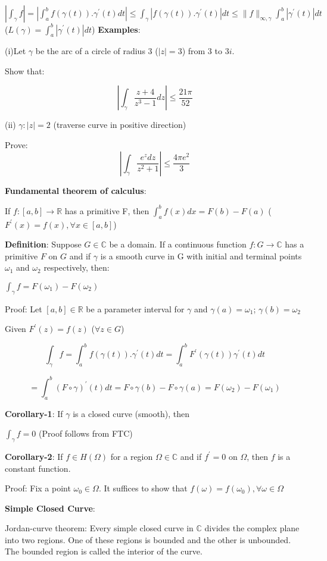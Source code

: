 \documentclass{article}
\begin{document}
\begin{flushleft}
$|\int_{\gamma}^{} f|= |\int_{a}^{b} f(\gamma(t)).\gamma^{'}(t) dt| \leq \int_{\gamma}^{} |f(\gamma(t)).\gamma^{'}(t)| dt
\leq \|f\|_{\infty,\gamma} \int_{a}^{b} |\gamma^{'}(t)| dt$   ($L(\gamma)=\int_{a}^{b} |\gamma^{'}(t)| dt$)
\textbf{Examples}: 

(i)Let $\gamma$ be the arc of a circle of radius 3 ($|z|=3$) from $3$ to $3i$.

Show that:

$$|\int_{\gamma}^{} \frac{z+4}{z^3-1} dz| \leq \frac{21\pi}{52}$$

(ii) $\gamma: |z|=2$  (traverse curve in positive direction)

Prove: $$|\int_{\gamma}^{} \frac{e^z dz}{z^2+1} | \leq \frac{4\pi e^2}{3}$$

\textbf{Fundamental theorem of calculus}: 

If $f:[a,b]\rightarrow \mathds{R}$ has a primitive F, then $\int_{a}^{b} f(x) dx =F(b)-F(a)$ ($F^{'}(x)=f(x), \forall x\in [a,b]$)

\textbf{Definition}: Suppose $G\in \mathds{C}$ be a domain. If a continuous function $f:G\rightarrow \mathds{C}$ has a primitive $F$ on $G$ and if $\gamma$ is a smooth curve in G with initial and terminal points $\omega_1$ and $\omega_2$ respectively, then:

$\int_{\gamma}^{} f = F(\omega_1) - F(\omega_2)$

Proof: Let $[a,b]\in \mathds{R}$ be a parameter interval for $\gamma$ and $\gamma(a)=\omega_1$; $\gamma(b)=\omega_2$

Given $F^{'}(z)=f(z)$   ($\forall z \in G$)

$$\int_{\gamma}^{} f = \int_{a}^{b} f(\gamma(t)).\gamma^{'}(t) dt = \int_{a}^{b} F^{'}(\gamma(t))\gamma^{'}(t) dt$$

$$= \int_{a}^{b} (F \circ \gamma)^{'}(t) dt = F \circ \gamma(b)-F \circ \gamma(a)= F(\omega_2)-F(\omega_1)$$

\textbf{Corollary-1}: If $\gamma$ is a closed curve (smooth), then

$\int_{\gamma}^{} f =0$ (Proof follows from FTC)

\textbf{Corollary-2}: If $f\in H(\Omega)$ for a region $\Omega\in \mathds{C}$ and if $f^{'}=0$ on $\Omega$, then $f$ is a constant function.

Proof: Fix a point $\omega_0\in \Omega$. It suffices to show that $f(\omega)=f(\omega_0), \forall \omega \in \Omega$

\textbf{Simple Closed Curve}: 

Jordan-curve theorem: Every simple closed curve in $\mathds{C}$ divides the complex plane into two regions. One of these regions is bounded and the other is unbounded. The bounded region is called the interior of the curve.


\end{flushleft}
\end{document}
